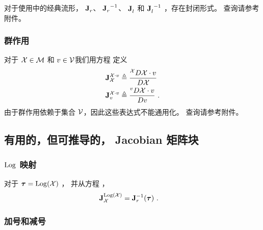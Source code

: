 对于使用中的经典流形， ${{\bf J}^{}_{r}}$、 ${{\bf J}^{}_{r}}^{-1}$、 ${{\bf J}^{}_{l}}$ 和 ${{\bf J}^{}_{l}}^{-1}$ ，存在封闭形式。
查询请参考附件。


\subsubsection{群作用}


对于 $\mathcal{X}\in\mathcal{M}$ 和 $v\in\mathcal{V}$我们用方程  定义
%
\begin{align}
\mjac{\cX\cdot v}{\cX} &\te \rdpar{\cX\cdot v}{\cX} \\
\mjac{\cX\cdot v}{v}  &\te \rdpar{\cX\cdot v}{v} 
~.
\end{align}
%
由于群作用依赖于集合 $\mathcal{V}$，因此这些表达式不能通用化。
查询请参考附件。



\subsection{有用的，但可推导的， Jacobian 矩阵块}

\subsubsection[Log map]{$\operatorname*{Log}$ 映射}

对于 ${\bm \tau}=\operatorname*{Log}(\mathcal{X})$ ，
并从方程  ，
%
\begin{align}\label{equ:Jac_log}
{{\bf J}^{\operatorname*{Log}(\mathcal{X})}_{\mathcal{X}}} 
&= {{\bf J}^{-1}_{r}}({\bm \tau}) 
~.
\end{align}

\subsubsection{加号和减号}

